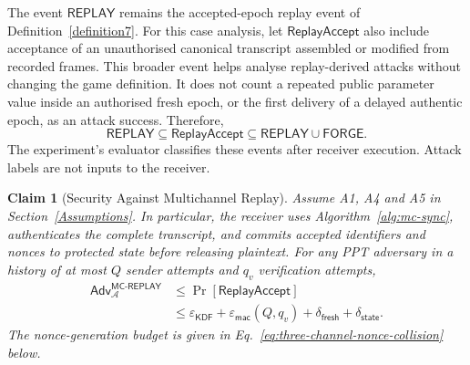 \documentclass[pdflatex,sn-mathphys-num]{sn-jnl}%
\newtheorem{claim}{Claim}
\theoremstyle{definition}
\theoremstyle{game}
\theoremstyle{thmstyleone}%
\theoremstyle{thmstyletwo}%
\theoremstyle{thmstylethree}%
\begin{document}
The event $\mathsf{REPLAY}$ remains the accepted-epoch replay event of
Definition~\ref{definition7}. For this case analysis, let
$\mathsf{ReplayAccept}$ also include acceptance of an unauthorised
canonical transcript assembled or modified from recorded frames.
This broader event helps analyse replay-derived attacks without changing
the game definition. It does not count a repeated public parameter value
inside an authorised fresh epoch, or the first delivery of a delayed
authentic epoch, as an attack success. Therefore,
\begin{equation}\label{eq:replay-success-scope}
\mathsf{REPLAY}\subseteq\mathsf{ReplayAccept}
\subseteq\mathsf{REPLAY}\cup\mathsf{FORGE}.
\end{equation}
The experiment's evaluator classifies these events after receiver
execution. Attack labels are not inputs to the receiver.

\begin{claim}[Security Against Multichannel Replay]\label{Claim3}
Assume A1, A4 and A5 in Section~\ref{Assumptions}. In particular, the
receiver uses Algorithm~\ref{alg:mc-sync}, authenticates the complete
transcript, and commits accepted identifiers and nonces to protected state
before releasing plaintext. For any PPT adversary in a history of at most $Q$
sender attempts and $q_v$ verification attempts,
\begin{align}\label{eq:mc-replay-bound}
\mathsf{Adv}^{\mathsf{MC\text{-}REPLAY}}_{\mathcal A}
&\le\Pr[\mathsf{ReplayAccept}]\nonumber\\
&\le\varepsilon_{\mathsf{KDF}}+\varepsilon_{\mathsf{mac}}(Q,q_v)
+\delta_{\mathsf{fresh}}+\delta_{\mathsf{state}}.
\end{align}
The nonce-generation budget is given in
Eq.~\eqref{eq:three-channel-nonce-collision} below.
\end{claim}
\end{document}
